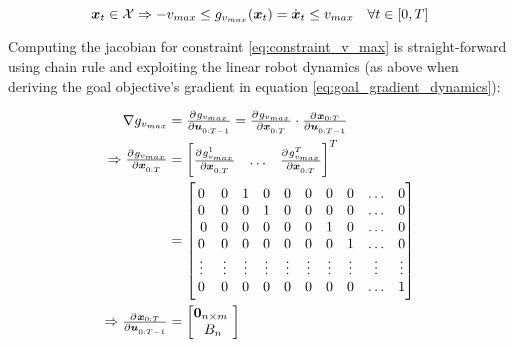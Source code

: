 \begin{equation}
\boldsymbol{x}_t \in \mathcal{X} \Rightarrow -v_{max} \leq g_{v_{max}}(\boldsymbol{x}_t) = \dot{\boldsymbol{x}}_t \leq v_{max} \quad \forall t \in [0, T]
\label{eq:constraint_v_max}
\end{equation}

Computing the jacobian for constraint \ref{eq:constraint_v_max} is straight-forward using chain rule and exploiting the linear robot dynamics (as above when deriving the goal objective's gradient in equation \ref{eq:goal_gradient_dynamics}):  

\begin{align}
\nabla g_{v_{max}} &= \pd{g_{v_{max}}}{\u_{0:T-1}} = \pd{g_{v_{max}}}{\x_{0:T}} \cdot \pd{\x_{0:T}}{\u_{0:T-1}} \\
\Rightarrow \pd{g_{v_{max}}}{\x_{0:T}} &= \begin{bmatrix} \pd{g_{v_{max}}^1}{\x_{0:T}} & \hdots & \pd{g_{v_{max}}^T}{\x_{0:T}}\end{bmatrix}^T  \\
&= \begin{bmatrix} 
0 & 0 & 1 & 0 & 0 & 0 & 0 & 0 & \hdots & 0 \\ 
0 & 0 & 0 & 1 & 0 & 0 & 0 & 0 & \hdots & 0 \\  
0 & 0 & 0 & 0 & 0 & 0 & 1 & 0 & \hdots & 0 \\
0 & 0 & 0 & 0 & 0 & 0 & 0 & 1 & \hdots & 0 \\ 
\vdots & \vdots & \vdots & \vdots & \vdots & \vdots & \vdots & \vdots & \vdots & \vdots \\
0 & 0 & 0 & 0 & 0 & 0 & 0 & 0 & \hdots & 1 \end{bmatrix} \\
\Rightarrow \pd{\x_{0:T}}{\u_{0:T-1}} &= \begin{bmatrix} \mathbf{0}_{n \times m} \\ B_n \end{bmatrix}
\end{align}
